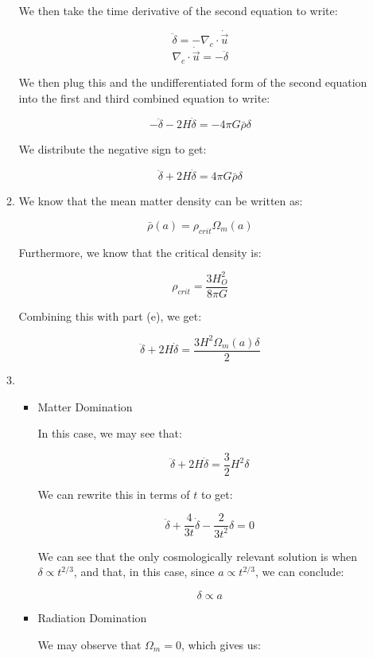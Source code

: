 \begin{enumerate}
\begin{enumerate}
          We then take the time derivative of the second equation to write:

          $$\ddot{\delta}=-\nabla_c\cdot\dot{\vec{u}}$$
          $$\nabla_c\cdot\dot{\vec{u}}=-\ddot{\delta}$$

          We then plug this and the undifferentiated form of the second equation into the first and third combined equation to write:

          $$-\ddot{\delta}-2H\dot{\delta}=-4\pi G\bar{\rho}\delta$$

          We distribute the negative sign to get:

          $$\boxed{\ddot{\delta}+2H\dot{\delta}=4\pi G\bar{\rho}\delta}$$

      \item We know that the mean matter density can be written as:

        $$\bar{\rho}(a)=\rho_{crit}\Omega_m(a)$$

        Furthermore, we know that the critical density is:

        $$\rho_{crit}=\frac{3H_O^2}{8\pi G}$$

        Combining this with part (e), we get:

        $$\boxed{\ddot{\delta}+2H\dot{\delta}=\frac{3H^2\Omega_m(a)\delta}{2}}$$

      \item 

        \begin{itemize}

          \item Matter Domination

            In this case, we may see that:

            $$\ddot{\delta}+2H\dot{\delta}=\frac{3}{2}H^2\delta$$

            We can rewrite this in terms of $t$ to get:

            $$\ddot{\delta}+\frac{4}{3t}\dot{\delta}-\frac{2}{3t^2}\delta=0$$

            We can see that the only cosmologically relevant solution is when $\delta\propto t^{2/3}$, and that, in this case, since $a\propto t^{2/3}$, we can conclude:

            $$\boxed{\delta\propto a}$$

          \item Radiation Domination

            We may observe that $\Omega_m=0$, which gives us:


\end{itemize}
\end{enumerate}
\end{enumerate}
